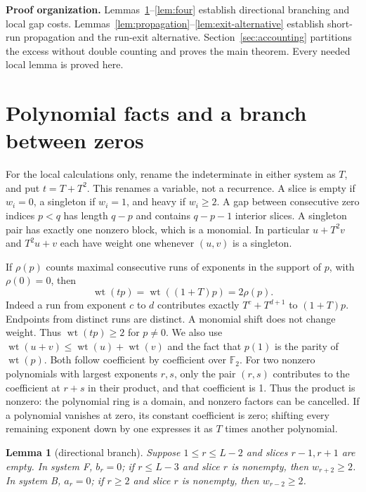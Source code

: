 \documentclass{article}
\newtheorem{lemma}{Lemma}
\DeclareMathOperator{\wt}{wt}
\begin{document}
\textbf{Proof organization.} Lemmas~\ref{lem:branch}--\ref{lem:four} establish directional
branching and local gap costs. Lemmas~\ref{lem:propagation}--\ref{lem:exit-alternative} establish
short-run propagation and the run-exit alternative. Section~\ref{sec:accounting} partitions the
excess without double counting and proves the main theorem. Every needed local lemma is proved
here.

\section{Polynomial facts and a branch between zeros}\label{sec:polynomial}

For the local calculations only, rename the indeterminate in either system as \(T\), and put
\(t = T + T^2\). This renames a variable, not a recurrence. A slice is empty if \(w_i = 0\), a
singleton if \(w_i = 1\), and heavy if \(w_i \ge 2\). A gap between consecutive zero indices
\(p < q\) has length \(q - p\) and contains \(q - p - 1\) interior slices. A singleton pair has
exactly one nonzero block, which is a monomial. In particular \(u + T^2 v\) and \(T^2 u + v\) each
have weight one whenever \((u,v)\) is a singleton.

If \(\rho(p)\) counts maximal consecutive runs of exponents in the support of \(p\), with
\(\rho(0) = 0\), then
\begin{equation}\label{eq:runs}
  \wt(tp) = \wt((1 + T)p) = 2\rho(p).
\end{equation}
Indeed a run from exponent \(c\) to \(d\) contributes exactly \(T^c + T^{d+1}\) to \((1 + T)p\).
Endpoints from distinct runs are distinct. A monomial shift does not change weight. Thus
\(\wt(tp) \ge 2\) for \(p \ne 0\). We also use \(\wt(u + v) \le \wt(u) + \wt(v)\) and the fact
that \(p(1)\) is the parity of \(\wt(p)\). Both follow coefficient by coefficient over
\(\mathbb{F}_2\). For two nonzero polynomials with largest exponents \(r, s\), only the pair
\((r,s)\) contributes to the coefficient at \(r + s\) in their product, and that coefficient is 1.
Thus the product is nonzero: the polynomial ring is a domain, and nonzero factors can be
cancelled. If a polynomial vanishes at zero, its constant coefficient is zero; shifting every
remaining exponent down by one expresses it as \(T\) times another polynomial.

\begin{lemma}[directional branch]\label{lem:branch}
  Suppose \(1 \le r \le L-2\) and slices \(r - 1, r + 1\) are empty. In system F, \(b_r = 0\); if
  \(r \le L-3\) and slice \(r\) is nonempty, then \(w_{r+2} \ge 2\). In system B, \(a_r = 0\); if
  \(r \ge 2\) and slice \(r\) is nonempty, then \(w_{r-2} \ge 2\).
\end{lemma}
\end{document}

